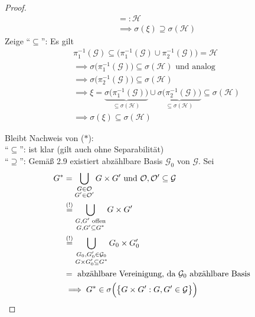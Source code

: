 \begin{proof}
\begin{align*}
&=:\mathcal{H}\\
&\implies\sigma(\xi)\supseteq\sigma(\mathcal{H})
\end{align*}
Zeige ``$\subseteq$'': Es gilt
\begin{align*}
&\pi_1^{-1}(\mathcal{G})\subseteq\big(\pi_1^{-1}(\mathcal{G})\cup\pi_2^{-1}(\mathcal{G})\big)=\mathcal{H}\\
&\implies
\sigma\big(\pi_1^{-1}(\mathcal{G})\big)\subseteq\sigma(\mathcal{H})\text{ und analog }\\
&\implies
\sigma\big(\pi_2^{-1}(\mathcal{G})\big)\subseteq\sigma(\mathcal{H})\\
&\implies
\xi=\underbrace{\sigma\big(\pi_1^{-1}(\mathcal{G})\big)}_{\subseteq\sigma(\mathcal{H})}\cup\underbrace{\sigma\big(\pi_2^{-1}(\mathcal{G})\big)}_{\subseteq\sigma(\mathcal{H})}\subseteq\sigma(\mathcal{H})\\
&\implies
\sigma(\xi)\subseteq\sigma(\mathcal{H})
\end{align*}

Bleibt Nachweis von ($\ast$):\\
``$\subseteq$'': ist klar (gilt auch ohne Separabilität)\\
``$\supseteq$'': Gemäß 2.9 existiert abzählbare Basis $\mathcal{G}_0$  von $\mathcal{G}$. Sei
\begin{align*}
G^\ast&=\bigcup\limits_{\begin{subarray}{c}G\in\mathcal{O}\\G'\in\mathcal{O}'\end{subarray}}G\times G'\text{ und }\mathcal{O},\mathcal{O}'\subseteq\mathcal{G}\\
&\stackrel{(!)}{=}
\bigcup\limits_{\begin{subarray}{c}
G,G'\text{ offen}\\
G,G'\subseteq G^\ast
\end{subarray}}
G\times G'\\
&\stackrel{(!)}{=}
\bigcup\limits_{\begin{subarray}{c}
G_0,G_0'\in\mathcal{G}_0\\
G\times G_0'\subseteq G^\ast
\end{subarray}}
G_0\times G_0'\\
&=\text{ abzählbare Vereinigung, da $\mathcal{G}_0$ abzählbare Basis }\\
&\implies
G^\ast\in\sigma\Big(\big\lbrace G\times G':G,G'\in\mathcal{G}\big\rbrace\Big)
\end{align*}
\end{proof}

